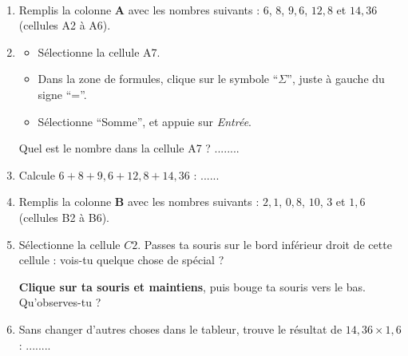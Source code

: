 \documentclass[a4paper,11pt]{article}
\begin{document}
\begin{exercice}\
	\begin{enumerate}
		\item Remplis la colonne \textbf{A} avec les nombres suivants : $6$,\hspace{0.5em} $8$,\hspace{0.5em} $9,6$,\hspace{0.5em} $12,8$ et $14,36$ (cellules A2 à A6).
		\item \begin{itemize}
			      \item Sélectionne la cellule A7.
			      \item Dans la zone de formules, clique sur le symbole “$Σ$”, juste à gauche du signe “=”.
			      \item Sélectionne “Somme”, et appuie sur \textit{Entrée}.
		      \end{itemize}
		      Quel est le nombre dans la cellule A7 ? ........
		\item Calcule $6 + 8 + 9,6 + 12,8 + 14,36$ : ......
		\item Remplis la colonne \textbf{B} avec les nombres suivants : $2,1$,\hspace{0.5em} $0,8$,\hspace{0.5em} $10$,\hspace{0.5em} $3$ et $1,6$ (cellules B2 à B6).
		\item Sélectionne la cellule $C2$. Passes ta souris sur le bord inférieur droit de cette cellule : vois-tu quelque chose de spécial ?

		      \textbf{Clique sur ta souris et maintiens}, puis bouge ta souris vers le bas. Qu'observes-tu ?
		\item Sans changer d'autres choses dans le tableur, trouve le résultat de $14,36 × 1,6$ : ........
	\end{enumerate}
\end{exercice}
\end{document}
